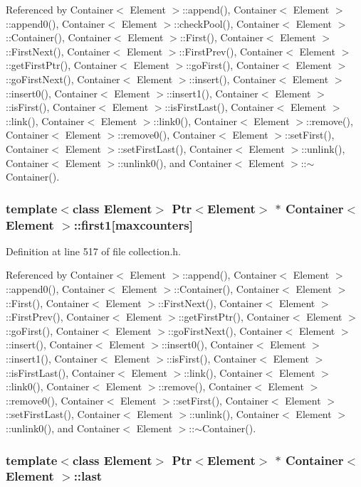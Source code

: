 Referenced by Container$<$ Element $>$::append(), Container$<$ Element $>$::append0(), Container$<$ Element $>$::checkPool(), Container$<$ Element $>$::Container(), Container$<$ Element $>$::First(), Container$<$ Element $>$::FirstNext(), Container$<$ Element $>$::FirstPrev(), Container$<$ Element $>$::getFirstPtr(), Container$<$ Element $>$::goFirst(), Container$<$ Element $>$::goFirstNext(), Container$<$ Element $>$::insert(), Container$<$ Element $>$::insert0(), Container$<$ Element $>$::insert1(), Container$<$ Element $>$::isFirst(), Container$<$ Element $>$::isFirstLast(), Container$<$ Element $>$::link(), Container$<$ Element $>$::link0(), Container$<$ Element $>$::remove(), Container$<$ Element $>$::remove0(), Container$<$ Element $>$::setFirst(), Container$<$ Element $>$::setFirstLast(), Container$<$ Element $>$::unlink(), Container$<$ Element $>$::unlink0(), and Container$<$ Element $>$::$\sim$Container().\hypertarget{classContainer_17576ca73c7bfc3681c0783bd880f866}{
\subsubsection[{first1}]{\setlength{\rightskip}{0pt plus 5cm}template$<$class Element$>$ {\bf Ptr}$<$Element$>$ $\ast$ {\bf Container}$<$ Element $>$::{\bf first1}\mbox{[}{\bf maxcounters}\mbox{]}}}
\label{classContainer_17576ca73c7bfc3681c0783bd880f866}




Definition at line 517 of file collection.h.

Referenced by Container$<$ Element $>$::append(), Container$<$ Element $>$::append0(), Container$<$ Element $>$::Container(), Container$<$ Element $>$::First(), Container$<$ Element $>$::FirstNext(), Container$<$ Element $>$::FirstPrev(), Container$<$ Element $>$::getFirstPtr(), Container$<$ Element $>$::goFirst(), Container$<$ Element $>$::goFirstNext(), Container$<$ Element $>$::insert(), Container$<$ Element $>$::insert0(), Container$<$ Element $>$::insert1(), Container$<$ Element $>$::isFirst(), Container$<$ Element $>$::isFirstLast(), Container$<$ Element $>$::link(), Container$<$ Element $>$::link0(), Container$<$ Element $>$::remove(), Container$<$ Element $>$::remove0(), Container$<$ Element $>$::setFirst(), Container$<$ Element $>$::setFirstLast(), Container$<$ Element $>$::unlink(), Container$<$ Element $>$::unlink0(), and Container$<$ Element $>$::$\sim$Container().\hypertarget{classContainer_f47de54dbd8b37934f0ead4fa7b2a93c}{
\subsubsection[{last}]{\setlength{\rightskip}{0pt plus 5cm}template$<$class Element$>$ {\bf Ptr}$<$Element$>$ $\ast$ {\bf Container}$<$ Element $>$::{\bf last}}}
\label{classContainer_f47de54dbd8b37934f0ead4fa7b2a93c}




